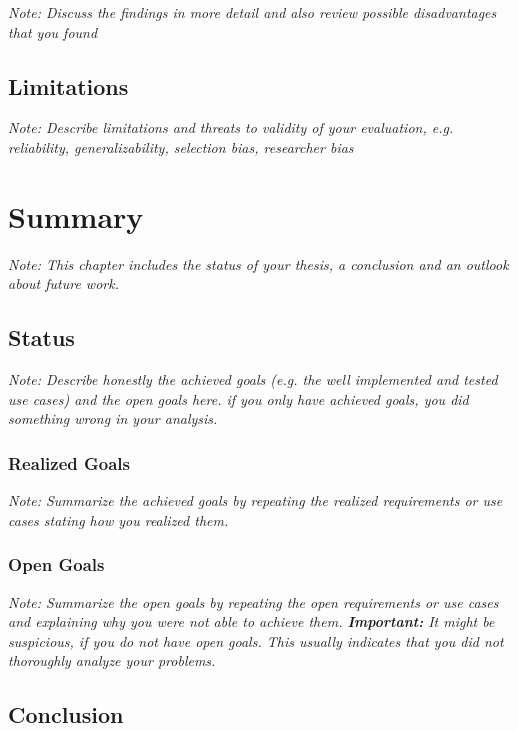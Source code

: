\documentclass[a4paper,12pt,twoside]{report}
\begin{document}
\textit{Note: Discuss the findings in more detail and also review possible disadvantages that you found}

\section{Limitations}

\textit{Note: Describe limitations and threats to validity of your evaluation, e.g. reliability, generalizability, selection bias, researcher bias}




\chapter{Summary}

\textit{Note: This chapter includes the status of your thesis, a conclusion and an outlook about future work.}

\section{Status}

\textit{Note: Describe honestly the achieved goals (e.g. the well implemented and tested use cases) and the open goals here. if you only have achieved goals, you did something wrong in your analysis.}

\subsection{Realized Goals}

\textit{Note: Summarize the achieved goals by repeating the realized requirements or use cases stating how you realized them.}

\subsection{Open Goals}

\textit{Note: Summarize the open goals by repeating the open requirements or use cases and explaining why you were not able to achieve them. \textbf{Important:} It might be suspicious, if you do not have open goals. This usually indicates that you did not thoroughly analyze your problems.}

\section{Conclusion}
\end{document}
